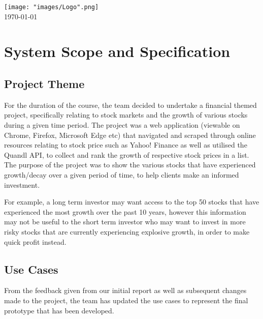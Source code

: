 \documentclass[11pt]{article}
\numberwithin{figure}{section}
\begin{document}
\begin{titlepage}

\texttt{[image: "images/Logo".png]}\\[1cm] %
 

{\large \today}\\[3cm] 

\vfill %
\end{titlepage}

\tableofcontents
\thispagestyle{empty}
\clearpage

\section{System Scope and Specification}
    \subsection{Project Theme}
        For the duration of the course, the team decided to undertake a financial themed project, specifically relating to stock markets and the growth of various stocks during a given time period. The project was a web application (viewable on Chrome, Firefox, Microsoft Edge etc) that navigated and scraped through online resources relating to stock price such as Yahoo! Finance as well as utilised the Quandl API, to collect and rank the growth of respective stock prices in a list. The purpose of the project was to show the various stocks that have experienced growth/decay over a given period of time, to help clients make an informed investment. 
        
        \bigskip
        \noindent
        For example, a long term investor may want access to the top 50 stocks that have experienced the most growth over the past 10 years, however this information may not be useful to the short term investor who may want to invest in more risky stocks that are currently experiencing explosive growth, in order to make quick profit instead.
    
    \subsection{Use Cases}
        From the feedback given from our initial report as well as subsequent changes made to the project, the team has updated the use cases to represent the final prototype that has been developed.
        
\end{document}
